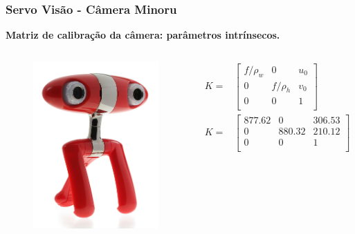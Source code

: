 \documentclass{beamer}
\newcommand\m[1]{\begin{bmatrix}#1\end{bmatrix}}
\begin{document}
\begin{frame}
\frametitle{Servo Visão - Câmera Minoru}
\textbf{Matriz de calibração da câmera:  parâmetros intrínsecos.}
\begin{columns}[c] %
\begin{figure}
\includegraphics[width=0.5\linewidth]{./img/minoru.jpg}
\end{figure}
\begin{align*}
{K} =& \m {
	f/\rho_w & 0 & u_0 \\
	0        & f/\rho_h &v_0 \\
	0 & 0 & 1 \\
}
\\
{K} =& 
\m{
	877.62 	& 0 		& 306.53 \\
	0  		& 880.32 	& 210.12 \\
	0   	& 0 		& 1 \\	
}	
\end{align*}

\end{columns}
\end{frame}
\end{document}
